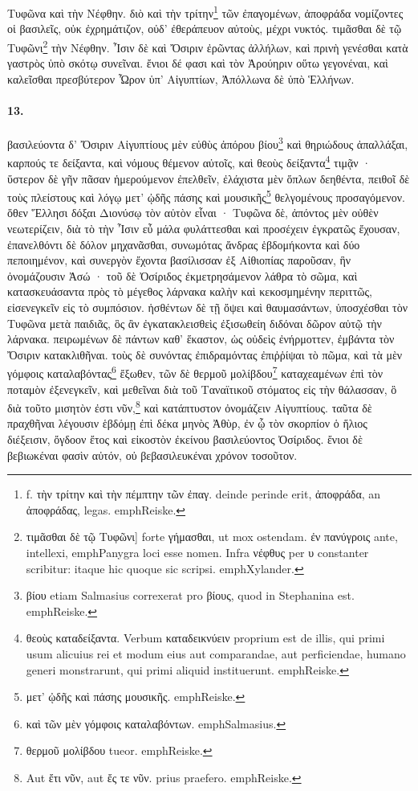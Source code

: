 \documentclass[a4paper, 11pt, oneside, polutonikogreek, german]{article}
\begin{document}
Τυφῶνα καὶ τὴν Νέφθην. διὸ καὶ τὴν τρίτην\footnote{f. τὴν τρίτην καὶ τὴν πέμπτην τῶν ἐπαγ. deinde perinde erit, ἀποφράδα, an ἀποφράδας, legas. emph{Reiske.}} τῶν ἐπαγομένων, ἀποφράδα νομίζοντες οἱ βασιλεῖς, οὐκ ἐχρημάτιζον, οὐδ' ἐθεράπευον αὐτοὺς, μέχρι νυκτός. τιμᾶσθαι δὲ τῷ Τυφῶνι\footnote{τιμᾶσθαι δὲ τῷ Τυφῶνι] forte γήμασθαι, ut mox ostendam. ἐν πανύγροις ante, intellexi, emph{Panygra} loci esse nomen. Infra νέφθυς per υ constanter scribitur: itaque hic quoque sic scripsi. emph{Xylander.}} τὴν Νέφθην. Ἶσιν δὲ καὶ Ὄσιριν ἐρῶντας ἀλλήλων, καὶ πρινὴ γενέσθαι κατὰ γαστρὸς ὑπὸ σκότῳ συνεῖναι. ἔνιοι δέ φασι καὶ τὸν Ἀρούηριν οὕτω γεγονέναι, καὶ καλεῖσθαι πρεσβύτερον Ὦρον ὑπ' Αἰγυπτίων, Ἀπόλλωνα δὲ ὑπὸ Ἑλλήνων.

\paragraph{13.}
βασιλεύοντα δ' Ὄσιριν Αἰγυπτίους μὲν εὐθὺς ἀπόρου βίου\footnote{βίου etiam Salmasius correxerat pro βίους, quod in Stephanina est. emph{Reiske.}} καὶ θηριώδους ἀπαλλάξαι, καρπούς τε δείξαντα, καὶ νόμους θέμενον αὐτοῖς, καὶ θεοὺς δείξαντα\footnote{θεοὺς καταδείξαντα. Verbum καταδεικνύειν proprium est de illis, qui primi usum alicuius rei et modum eius aut comparandae, aut perficiendae, humano generi monstrarunt, qui primi aliquid instituerunt. emph{Reiske.}} τιμᾷν · ὕστερον δὲ γῆν πᾶσαν ἡμερούμενον ἐπελθεῖν, ἐλάχιστα μὲν ὅπλων δεηθέντα, πειθοῖ δὲ τοὺς πλείστους καὶ λόγῳ μετ' ᾠδῆς πάσης καὶ μουσικῆς\footnote{μετ' ᾠδῆς καὶ πάσης μουσικῆς. emph{Reiske.}} θελγομένους προσαγόμενον. ὅθεν Ἕλλησι δόξαι Διονύσῳ τὸν αὐτὸν εἶναι · Τυφῶνα δὲ, ἀπόντος μὲν οὐθὲν νεωτερίζειν, διὰ τὸ τὴν Ἶσιν εὖ μάλα φυλάττεσθαι καὶ προσέχειν ἐγκρατῶς ἔχουσαν, ἐπανελθόντι δὲ δόλον μηχανᾶσθαι, συνωμότας ἄνδρας ἑβδομήκοντα καὶ δύο πεποιημένον, καὶ συνεργὸν ἔχοντα βασίλισσαν ἐξ Αἰθιοπίας παροῦσαν, ἣν ὀνομάζουσιν Ἀσώ · τοῦ δὲ Ὀσίριδος ἐκμετρησάμενον λάθρα τὸ σῶμα, καὶ κατασκευάσαντα πρὸς τὸ μέγεθος λάρνακα καλὴν καὶ κεκοσμημένην περιττῶς, εἰσενεγκεῖν εἰς τὸ συμπόσιον. ἡσθέντων δὲ τῇ ὄψει καὶ θαυμασάντων, ὑποσχέσθαι τὸν Τυφῶνα μετὰ παιδιᾶς, ὃς ἂν ἐγκατακλεισθεὶς ἐξισωθείη διδόναι δῶρον αὐτῷ τὴν λάρνακα. πειρωμένων δὲ πάντων καθ' ἕκαστον, ὡς οὐδεὶς ἐνήρμοττεν, ἐμβάντα τὸν Ὄσιριν κατακλιθῆναι. τοὺς δὲ συνόντας ἐπιδραμόντας ἐπιῤῥίψαι τὸ πῶμα, καὶ τὰ μὲν γόμφοις καταλαβόντας\footnote{καὶ τῶν μὲν γόμφοις καταλαβόντων. emph{Salmasius.}} ἔξωθεν, τῶν δὲ θερμοῦ μολίβδου\footnote{θερμοῦ μολίβδου tueor. emph{Reiske.}} καταχεαμένων ἐπὶ τὸν ποταμὸν ἐξενεγκεῖν, καὶ μεθεῖναι διὰ τοῦ Ταναϊτικοῦ στόματος εἰς τὴν θάλασσαν, ὃ διὰ τοῦτο μισητὸν ἐστι νῦν,\footnote{Aut ἔτι νῦν, aut ἔς τε νῦν. prius praefero. emph{Reiske.}} καὶ κατάπτυστον ὀνομάζειν Αἰγυπτίους. ταῦτα δὲ πραχθῆναι λέγουσιν ἑβδόμῃ ἐπὶ δέκα μηνὸς Ἀθὺρ, ἐν ᾧ τὸν σκορπίον ὁ ἥλιος διέξεισιν, ὄγδοον ἔτος καὶ εἰκοστὸν ἐκείνου βασιλεύοντος Ὀσίριδος. ἔνιοι δὲ βεβιωκέναι φασὶν αὐτόν, οὐ βεβασιλευκέναι χρόνον τοσοῦτον.
\end{document}
